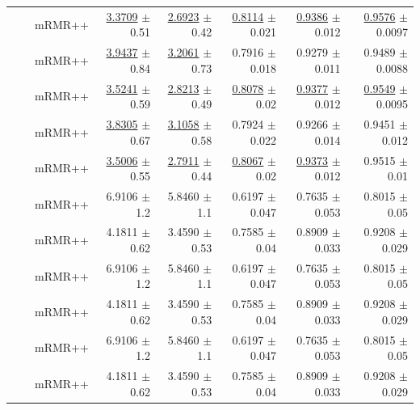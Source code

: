 \begin{longtable}{llp{}rrrrr}
 &  & mRMR++ & \underline{3.3709} {\scriptsize $\pm$ 0.51} & \underline{2.6923} {\scriptsize $\pm$ 0.42} & \underline{0.8114} {\scriptsize $\pm$ 0.021} & \underline{0.9386} {\scriptsize $\pm$ 0.012} & \underline{0.9576} {\scriptsize $\pm$ 0.0097} \\
 &  & mRMR++ & \underline{3.9437} {\scriptsize $\pm$ 0.84} & \underline{3.2061} {\scriptsize $\pm$ 0.73} & 0.7916 {\scriptsize $\pm$ 0.018} & 0.9279 {\scriptsize $\pm$ 0.011} & 0.9489 {\scriptsize $\pm$ 0.0088} \\
 &  & mRMR++ & \underline{3.5241} {\scriptsize $\pm$ 0.59} & \underline{2.8213} {\scriptsize $\pm$ 0.49} & \underline{0.8078} {\scriptsize $\pm$ 0.02} & \underline{0.9377} {\scriptsize $\pm$ 0.012} & \underline{0.9549} {\scriptsize $\pm$ 0.0095} \\
 &  & mRMR++ & \underline{3.8305} {\scriptsize $\pm$ 0.67} & \underline{3.1058} {\scriptsize $\pm$ 0.58} & 0.7924 {\scriptsize $\pm$ 0.022} & 0.9266 {\scriptsize $\pm$ 0.014} & 0.9451 {\scriptsize $\pm$ 0.012} \\
 &  & mRMR++ & \underline{3.5006} {\scriptsize $\pm$ 0.55} & \underline{2.7911} {\scriptsize $\pm$ 0.44} & \underline{0.8067} {\scriptsize $\pm$ 0.02} & \underline{0.9373} {\scriptsize $\pm$ 0.012} & 0.9515 {\scriptsize $\pm$ 0.01} \\
 &  & mRMR++ & 6.9106 {\scriptsize $\pm$ 1.2} & 5.8460 {\scriptsize $\pm$ 1.1} & 0.6197 {\scriptsize $\pm$ 0.047} & 0.7635 {\scriptsize $\pm$ 0.053} & 0.8015 {\scriptsize $\pm$ 0.05} \\
 &  & mRMR++ & 4.1811 {\scriptsize $\pm$ 0.62} & 3.4590 {\scriptsize $\pm$ 0.53} & 0.7585 {\scriptsize $\pm$ 0.04} & 0.8909 {\scriptsize $\pm$ 0.033} & 0.9208 {\scriptsize $\pm$ 0.029} \\
 &  & mRMR++ & 6.9106 {\scriptsize $\pm$ 1.2} & 5.8460 {\scriptsize $\pm$ 1.1} & 0.6197 {\scriptsize $\pm$ 0.047} & 0.7635 {\scriptsize $\pm$ 0.053} & 0.8015 {\scriptsize $\pm$ 0.05} \\
 &  & mRMR++ & 4.1811 {\scriptsize $\pm$ 0.62} & 3.4590 {\scriptsize $\pm$ 0.53} & 0.7585 {\scriptsize $\pm$ 0.04} & 0.8909 {\scriptsize $\pm$ 0.033} & 0.9208 {\scriptsize $\pm$ 0.029} \\
 &  & mRMR++ & 6.9106 {\scriptsize $\pm$ 1.2} & 5.8460 {\scriptsize $\pm$ 1.1} & 0.6197 {\scriptsize $\pm$ 0.047} & 0.7635 {\scriptsize $\pm$ 0.053} & 0.8015 {\scriptsize $\pm$ 0.05} \\
 &  & mRMR++ & 4.1811 {\scriptsize $\pm$ 0.62} & 3.4590 {\scriptsize $\pm$ 0.53} & 0.7585 {\scriptsize $\pm$ 0.04} & 0.8909 {\scriptsize $\pm$ 0.033} & 0.9208 {\scriptsize $\pm$ 0.029} \\

\end{longtable}
